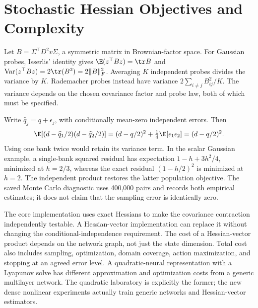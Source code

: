 \section{Stochastic Hessian Objectives and Complexity}
Let $B=\Sigma^\top D^2v\Sigma$, a symmetric matrix in Brownian-factor space. For Gaussian probes, Isserlis' identity gives $\E(z^\top Bz)=\tr B$ and $\operatorname{Var}(z^\top Bz)=2\tr(B^2)=2\|B\|_F^2$. Averaging $K$ independent probes divides the variance by $K$. Rademacher probes instead have variance $2\sum_{i\ne j}B_{ij}^2/K$. The variance depends on the chosen covariance factor and probe law, both of which must be specified.

Write $\widehat q_j=q+\epsilon_j$, with conditionally mean-zero independent errors. Then
\[
 \E[(d-\widehat q_1/2)(d-\widehat q_2/2)]
 =(d-q/2)^2+\tfrac14\E[\epsilon_1\epsilon_2]=(d-q/2)^2.
\]
Using one bank twice would retain its variance term. In the scalar Gaussian example, a single-bank squared residual has expectation $1-h+3h^2/4$, minimized at $h=2/3$, whereas the exact residual $(1-h/2)^2$ is minimized at $h=2$. The independent product restores the latter population objective. The saved Monte Carlo diagnostic uses 400,000 pairs and records both empirical estimates; it does not claim that the sampling error is identically zero.

The core implementation uses exact Hessians to make the covariance contraction independently testable. A Hessian-vector implementation can replace it without changing the conditional-independence requirement. The cost of a Hessian-vector product depends on the network graph, not just the state dimension. Total cost also includes sampling, optimization, domain coverage, action maximization, and stopping at an agreed error level. A quadratic-neural representation with a Lyapunov solve has different approximation and optimization costs from a generic multilayer network. The quadratic laboratory is explicitly the former; the new dense nonlinear experiments actually train generic networks and Hessian-vector estimators.

